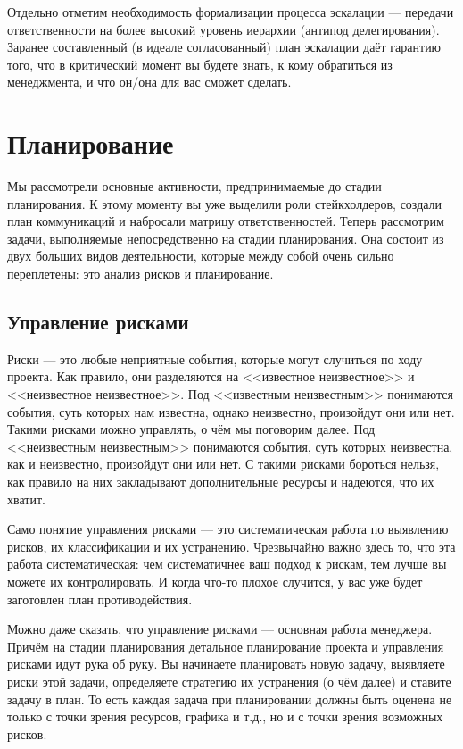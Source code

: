 \documentclass{../../text-style}
\begin{document}
Отдельно отметим необходимость формализации процесса эскалации --- передачи ответственности на более высокий уровень иерархии (антипод делегирования). Заранее составленный (в идеале согласованный) план эскалации даёт гарантию того, что в критический момент вы будете знать, к кому обратиться из менеджмента, и что он/она для вас сможет сделать.

\section{Планирование}

Мы рассмотрели основные активности, предпринимаемые до стадии планирования. К этому моменту вы уже выделили роли стейкхолдеров, создали план коммуникаций и набросали матрицу ответственностей. Теперь рассмотрим задачи, выполняемые непосредственно на стадии планирования. Она состоит из двух больших видов деятельности, которые между собой очень сильно переплетены: это анализ рисков и планирование. 

\subsection{Управление рисками}

Риски --- это любые неприятные события, которые могут случиться по ходу проекта. Как правило, они разделяются на <<известное неизвестное>> и <<неизвестное неизвестное>>. Под <<известным неизвестным>> понимаются события, суть которых нам известна, однако неизвестно, произойдут они или нет. Такими рисками можно управлять, о чём мы поговорим далее. Под <<неизвестным неизвестным>> понимаются события, суть которых неизвестна, как и неизвестно, произойдут они или нет. С такими рисками бороться нельзя, как правило на них закладывают дополнительные ресурсы и надеются, что их хватит.

Само понятие управления рисками --- это систематическая работа по выявлению рисков, их классификации и их устранению. Чрезвычайно важно здесь то, что эта работа систематическая: чем систематичнее ваш подход к рискам, тем лучше вы можете их контролировать. И когда что-то плохое случится, у вас уже будет заготовлен план противодействия.

Можно даже сказать, что управление рисками --- основная работа менеджера. Причём на стадии планирования детальное планирование проекта и управления рисками идут рука об руку. Вы начинаете планировать новую задачу, выявляете риски этой задачи, определяете стратегию их устранения (о чём далее) и ставите задачу в план. То есть каждая задача при планировании должны быть оценена не только с точки зрения ресурсов, графика и т.д., но и с точки зрения возможных рисков.
\end{document}
